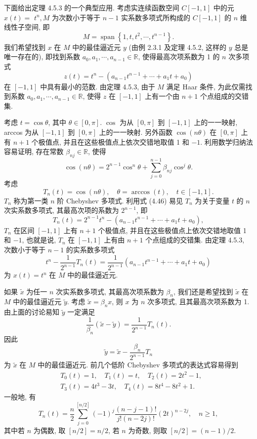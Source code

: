 \documentclass[openany]{ctexbook}
\theoremstyle{kaiti}
\theoremstyle{normal}
\begin{document}
下面给出定理 4.5.3 的一个典型应用. 考虑实连续函数空间 $C[-1,1]$ 中的元 $x(t)=$ $t^n, M$ 为次数小于等于 $n-1$ 实系数多项式所构成的 $C[-1,1]$ 的 $n$ 维线性子空间, 即
$$
M=\operatorname{span}\left\{1, t, t^2, \cdots, t^{n-1}\right\}.
$$
我们希望找到 $x$ 在 $M$ 中的最佳逼近元 $y$ (由例 2.3.1 及定理 4.5.2, 这样的 $y$ 总是唯一存在的), 即找到系数 $a_0, a_1, \cdots, a_{n-1} \in \mathbb{R}$, 使得最高次项系数为 1 的 $n$ 次多项式
$$
z(t)=t^n-\left(a_{n-1} t^{n-1}+\cdots+a_1 t+a_0\right)
$$
在 $[-1,1]$ 中具有最小的范数. 由定理 4.5.3, 由于 $M$ 满足 Haar 条件, 为此仅需找到系数 $a_0, a_1, \cdots, a_{n-1} \in \mathbb{R}$, 使得 $z$ 在 $[-1,1]$ 上有一个由 $n+1$ 个点组成的交错集.

考虑 $t=\cos \theta$, 其中 $\theta \in[0, \pi]$. $\cos$ 为从 $[0, \pi]$ 到 $[-1,1]$ 上的一一映射, arccos 为从 $[-1,1]$ 到 $[0, \pi]$ 上的一一映射. 另外函数 $\cos (n \theta)$ 在 $[0, \pi]$ 上有 $n+1$ 个极值点, 并且在这些极值点上依次交错地取值 1 和 $-1$. 利用数学归纳法容易证明, 存在常数 $\beta_{n j} \in \mathbb{R}$, 使得
\begin{equation}
  \cos (n \theta)=2^{n-1} \cos ^n \theta+\sum_{j=0}^{n-1} \beta_{n j} \cos ^{j} \theta.
\end{equation}
考虑
$$
T_n(t)=\cos (n \theta), \quad \theta=\arccos (t), \quad t \in[-1,1].
$$
$T_n$ 称为第一类 $n$ 阶 Chebyshev 多项式. 利用式 (4.46) 易见 $T_n$ 为关于变量 $t$ 的 $n$ 次实系数多项式, 其最高次项的系数为 $2^{n-1}$, 即
$$
T_n(t)=2^{n-1} t^n-\left(a_{n-1} t^{n-1}+\cdots+a_1 t+a_0\right),
$$
$T_n$ 在区间 $[-1,1]$ 上有 $n+1$ 个极值点, 并且在这些极值点上依次交错地取值 1 和 $-1$, 也就是说, $T_n$ 在 $[-1,1]$ 上有由 $n+1$ 个点组成的交错集. 由定理 4.5.3, 次数小于等于 $n-1$ 的实系数多项式
$$
t^n-\frac{1}{2^{n-1}} T_n(t)=\frac{1}{2^{n-1}}\left(a_{n-1} t^{n-1}+\cdots+a_1 t+a_0\right)
$$
为 $x(t)=t^n$ 在 $M$ 中的最佳逼近元.

如果 $\tilde{x}$ 为任一 $n$ 次实系数多项式, 其最高次项系数为 $\beta_n$, 我们还是希望找到 $\tilde{x}$ 在 $M$ 中的最佳逼近元 $\tilde{y}$. 考虑 $\tilde{x}=\beta_n x$, 则 $x$ 为 $n$ 次多项式, 且其最高次项系数为 1. 由上面的讨论易知 $\tilde{y}$ 一定满足
$$
\frac{1}{\beta_n}(\widetilde{x}-\tilde{y})=\frac{1}{2^{n-1}} T_n(t).
$$
因此
$$
\tilde{y}=\tilde{x}-\frac{\beta_n}{2^{n-1}} T_n
$$
为 $\widetilde{x}$ 在 $M$ 中的最佳逼近元.
前几个低阶 Chebyshev 多项式的表达式容易得到
$$
  \begin{aligned}
    &T_0(t)=1, \quad T_1(t)=t, \quad T_2(t)=2 t^2-1, \\
    &T_3(t)=4 t^3-3 t, \quad T_4(t)=8 t^4-8 t^2+1.
  \end{aligned}
$$
一般地, 有
$$
T_n(t)=\frac{n}{2} \sum_{j=0}^{[n / 2]}(-1)^{j} \frac{(n-j-1) !}{j !(n-2 j) !}(2 t)^{n-2 j}, \quad n \geqslant 1,
$$
其中若 $n$ 为偶数, 取 $[n / 2]=n / 2$, 若 $n$ 为奇数, 则取 $[n / 2]=(n-1) / 2$.
\end{document}
